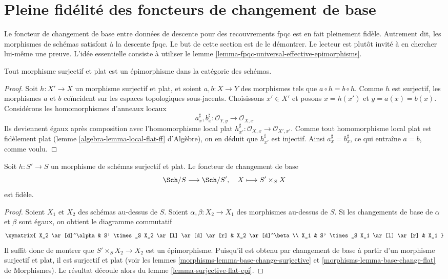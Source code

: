 \section{Pleine fidélité des foncteurs de changement de base}
\label{section-fully-faithful}

\noindent
Le foncteur de changement de base entre données de descente pour des
recouvrements fpqc est en fait pleinement fidèle. Autrement dit, les
morphismes de schémas satisfont à la descente fpqc. Le but de cette section
est de le démontrer. Le lecteur est plutôt invité à en chercher lui-même une
preuve. L'idée essentielle consiste à utiliser le
lemme \ref{lemma-fpqc-universal-effective-epimorphisms}.

\begin{lemma}
\label{lemma-surjective-flat-epi}
Tout morphisme surjectif et plat est un épimorphisme dans la catégorie des
schémas.
\end{lemma}

\begin{proof}
Soit $h : X' \to X$ un morphisme surjectif et plat, et soient
$a, b : X \to Y$ des morphismes tels que $a \circ h = b \circ h$.
Comme $h$ est surjectif, les morphismes $a$ et $b$ coïncident sur les
espaces topologiques sous-jacents. Choisissons $x' \in X'$ et posons
$x = h(x')$ et $y = a(x) = b(x)$. Considérons les homomorphismes d'anneaux
locaux
$$
a^\sharp_x, b^\sharp_x : \mathcal{O}_{Y, y} \to \mathcal{O}_{X, x}
$$
Ils deviennent égaux après composition avec l'homomorphisme local plat
$h^\sharp_{x'} : \mathcal{O}_{X, x} \to \mathcal{O}_{X', x'}$.
Comme tout homomorphisme local plat est fidèlement plat
(lemme \ref{algebra-lemma-local-flat-ff} d'Algèbre), on en déduit que
$h^\sharp_{x'}$ est injectif. Ainsi $a^\sharp_x = b^\sharp_x$, ce qui
entraîne $a = b$, comme voulu.
\end{proof}

\begin{lemma}
\label{lemma-ff-base-change-faithful}
Soit $h : S' \to S$ un morphisme de schémas surjectif et plat.
Le foncteur de changement de base
$$
\Sch/S \longrightarrow \Sch/S', \quad
X \longmapsto S' \times_S X
$$
est fidèle.
\end{lemma}

\begin{proof}
Soient $X_1$ et $X_2$ des schémas au-dessus de $S$.
Soient $\alpha, \beta : X_2 \to X_1$ des morphismes au-dessus de $S$.
Si les changements de base de $\alpha$ et $\beta$ sont égaux, on obtient le
diagramme commutatif
$$
\xymatrix{
X_2 \ar[d]^\alpha &
S' \times_S X_2 \ar[l] \ar[d] \ar[r] &
X_2 \ar[d]^\beta \\
X_1 &
S' \times_S X_1 \ar[l] \ar[r] &
X_1
}
$$
Il suffit donc de montrer que $S' \times_S X_2 \to X_2$ est un épimorphisme.
Puisqu'il est obtenu par changement de base à partir d'un morphisme surjectif
et plat, il est surjectif et plat (voir les lemmes
\ref{morphisms-lemma-base-change-surjective} et
\ref{morphisms-lemma-base-change-flat} de Morphismes). Le résultat découle
alors du lemme \ref{lemma-surjective-flat-epi}.
\end{proof}

